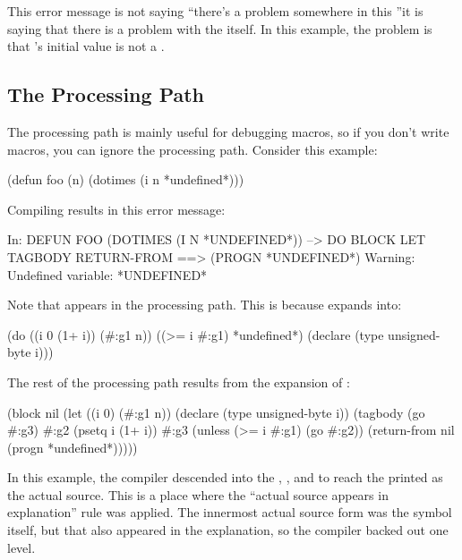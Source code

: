 This error message is not saying ``there's a problem somewhere in this
''\dash{}it is saying that there is a problem with the
 itself.  In this example, the problem is that 's
\false{} initial value is not a .


\subsection{The Processing Path}

The processing path is mainly useful for debugging macros, so if you don't
write macros, you can ignore the processing path.  Consider this example:

\begin{lisp}
(defun foo (n)
  (dotimes (i n *undefined*)))
\end{lisp}

Compiling results in this error message:

\begin{example}
In: DEFUN FOO
  (DOTIMES (I N *UNDEFINED*))
--> DO BLOCK LET TAGBODY RETURN-FROM 
==>
  (PROGN *UNDEFINED*)
Warning: Undefined variable: *UNDEFINED*
\end{example}

Note that  appears in the processing path.  This is because 
expands into:

\begin{lisp}
(do ((i 0 (1+ i)) (#:g1 n))
    ((>= i #:g1) *undefined*)
  (declare (type unsigned-byte i)))
\end{lisp}

The rest of the processing path results from the expansion of :

\begin{lisp}
(block nil
  (let ((i 0) (#:g1 n))
    (declare (type unsigned-byte i))
    (tagbody (go #:g3)
     #:g2    (psetq i (1+ i))
     #:g3    (unless (>= i #:g1) (go #:g2))
             (return-from nil (progn *undefined*)))))
\end{lisp}

In this example, the compiler descended into the ,
,  and  to reach the
 printed as the actual source.  This is a place where the
``actual source appears in explanation'' rule was applied.  The
innermost actual source form was the symbol  itself,
but that also appeared in the explanation, so the compiler backed out
one level.


